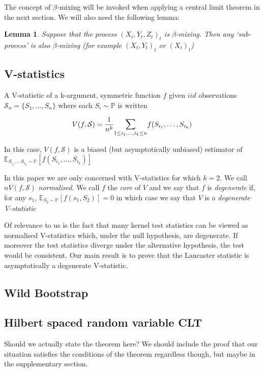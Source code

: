 \documentclass{article}
\newtheorem{lemma}{Lemma}
\begin{document}
The concept of $\beta$-mixing will be invoked when applying a central limit theorem in the next section. We will also need the following lemma:

\begin{lemma}\label{lemma:beta}
Suppose that the process $(X_t,Y_t,Z_t)_t$ is $\beta$-mixing. Then any `sub-process' is also $\beta$-mixing (for example $(X_t,Y_t)_t$ or $(X_t)_t$)
\end{lemma}

\subsection{V-statistics}
A V-statistic of a k-argument, symmetric function $f$ given $iid$ observations $\mathcal{S}_n = \{S_1,\ldots,S_n\}$ where each $S_i \sim \mathbb{P}$ is written

\[ V(f,\mathcal{S}) =  \frac{1}{n^k} \mathlarger{\sum}_{1\leq i_1,\ldots, i_k \leq n} f(S_{i_1},\ldots,S_{i_k})\]

In this case, $V(f,\mathcal{S})$ is a biased (but asymptotically unbiased) estimator of $\mathbb{E}_{S_{i_1},\ldots S_{i_k} \sim \mathbb{P}}[f(S_{i_1},\ldots,S_{i_k})]$

In this paper we are only concerned with V-statistics for which $k=2$. We call $nV(f,\mathcal{S})$ \emph{normalised}. We call $f$ the \emph{core} of $V$ and we say that $f$ is \emph{degenerate} if, for any $s_1$, $\mathbb{E}_{S_2 \sim \mathbb{P}}[f(s_1,S_2)] = 0$ in which case we say that $V$ is a \emph{degenerate V-statistic} 

Of relevance to us is the fact that many kernel test statistics can be viewed as normalised V-statistics which, under the null hypothesis, are degenerate. If moreover the test statistics diverge under the alternative hypothesis, the test would be consistent. Our main result is to prove that the Lancaster statistic is asymptotically a degenerate V-statistic.

\subsection{Wild Bootstrap}



\subsection{Hilbert spaced random variable CLT}

Should we actually state the theorem here? We should include the proof that our situation satisfies the conditions of the theorem regardless though, but maybe in the supplementary section.
\end{document}
